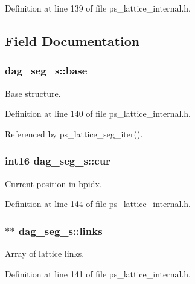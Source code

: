 Definition at line 139 of file ps\-\_\-lattice\-\_\-internal.\-h.



\subsection{Field Documentation}
\subsubsection[{base}]{ dag\-\_\-seg\-\_\-s\-::base}\label{structdag__seg__s_a72f90e137c1f83ab3df6ecd5e1b6dc71}


Base structure. 



Definition at line 140 of file ps\-\_\-lattice\-\_\-internal.\-h.



Referenced by ps\-\_\-lattice\-\_\-seg\-\_\-iter().

\subsubsection[{cur}]{\setlength{\rightskip}{0pt plus 5cm}int16 dag\-\_\-seg\-\_\-s\-::cur}\label{structdag__seg__s_a0fed697e06d12e5a0405fdcb0d97faf1}


Current position in bpidx. 



Definition at line 144 of file ps\-\_\-lattice\-\_\-internal.\-h.

\subsubsection[{links}]{$\ast$$\ast$ dag\-\_\-seg\-\_\-s\-::links}\label{structdag__seg__s_a5fcc22d787e4db1bdc728ff8faead738}


Array of lattice links. 



Definition at line 141 of file ps\-\_\-lattice\-\_\-internal.\-h.




